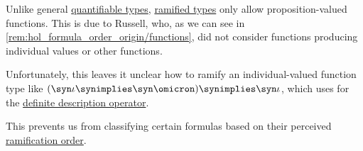 \begin{remark}\label{rem:unpropositional_functions_in_ramified_theory_of_types}
  Unlike general \hyperref[def:quantifiable_type]{quantifiable types}, \hyperref[def:ramified_theory_of_types/ramified_type]{ramified types} only allow proposition-valued functions. This is due to Russell, who, as we can see in \cref{rem:hol_formula_order_origin/functions}, did not consider functions producing individual values or other functions.

  Unfortunately, this leaves it unclear how to ramify an individual-valued function type like \( (\syn\iota \synimplies \syn\omicron) \synimplies \syn\iota \), which \textcite[57]{Church1940STT} uses for the \hyperref[con:description_operator]{definite description operator}.

  This prevents us from classifying certain formulas based on their perceived \hyperref[def:hol_formula_ramification_order]{ramification order}.
\end{remark}

